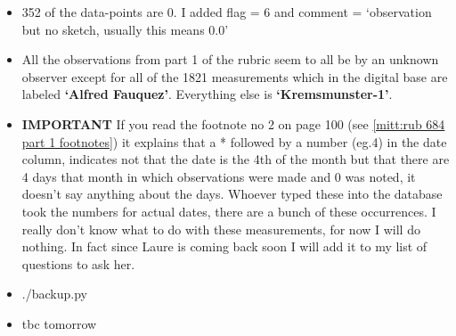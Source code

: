 \documentclass[12pt]{article}
\begin{document}
\begin{itemize}
\begin{itemize}
\begin{itemize}
            \item 352 of the data-points are 0. I added flag = 6 and comment = `observation but no sketch, usually this means 0.0'
            \item All the observations from part 1 of the rubric seem to all be by an unknown observer except for all of the 1821 measurements which in the digital base are labeled \textbf{`Alfred Fauquez'}. Everything else is \textbf{`Kremsmunster-1'}.
            \item \textbf{IMPORTANT} If you read the footnote no 2 on page 100 (see \ref{mitt:rub 684 part 1 footnotes}) it explains that a * followed by a number (eg.4) in the date column, indicates not that the date is the 4th of the month but that there are 4 days that month in which observations were made and 0 was noted, it doesn't say anything about the days. Whoever typed these into the database took the numbers for actual dates, there are a bunch of these occurrences. I really don't know what to do with these measurements, for now I will do nothing. In fact since Laure is coming back soon I will add it to my list of questions to ask her.
            \item ./backup.py
            \item tbc tomorrow
        \end{itemize}
    \end{itemize}
\end{itemize}
\end{document}
